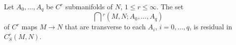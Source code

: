 Let $A_0, \ldots, A_q$ be $C^r$ submanifolds of $N$, $1 \leqslant r \leqslant \infty$. The set
$$\bigcap{}^r(M,N; A_0, \ldots, A_q)$$
of $C^r$ maps $M \to N$ that are transverse to each $A_i$, $i = 0, \ldots, q$, is residual in $C^r_S(M,N)$.
